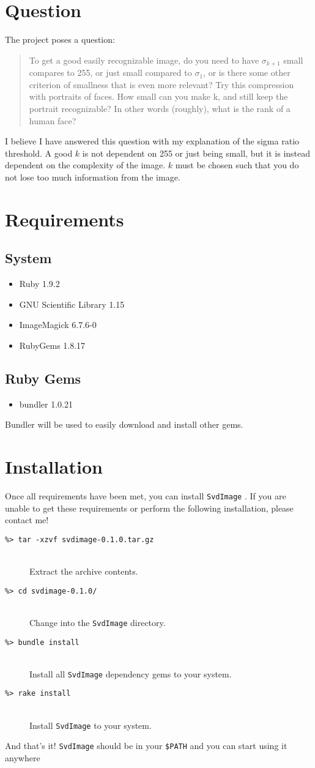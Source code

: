 \documentclass[12pt,letterpaper]{article}
\newcommand{\svdimage}{\texttt{SvdImage} }
\newcommand{\codeitem}[2]{\item[\texttt{\%> #1}] \hfill \\ #2}
\begin{document}
\section{Question}
The project poses a question:
\begin{quote}
To get a good easily recognizable image, do you need to have $\sigma_{k+1}$ small
compares to 255, or just small compared to $\sigma_1$, or is there some other criterion of smallness
that is even more relevant?
Try this compression with portraits of faces. How small can you make k, and still
keep the portrait recognizable? In other words (roughly), what is the rank of a human
face?
\end{quote}

I believe I have answered this question with my explanation of the sigma ratio
threshold. A good $k$ is not dependent on 255 or just being small, but it is
instead dependent on the complexity of the image. $k$ must be chosen such that
you do not lose too much information from the image.

\section{Requirements}
\subsection{System}
\begin{itemize}
\item Ruby 1.9.2
\item GNU Scientific Library 1.15
\item ImageMagick 6.7.6-0
\item RubyGems 1.8.17
\end{itemize}
\subsection{Ruby Gems}
\begin{itemize}
\item bundler 1.0.21
\end{itemize}
Bundler will be used to easily download and install other gems.

\section{Installation}
Once all requirements have been met, you can install \svdimage. If you are
unable to get these requirements or perform the following installation, please
contact me!
\begin{description}
\codeitem{tar -xzvf svdimage-0.1.0.tar.gz}{Extract the archive contents.}
\codeitem{cd svdimage-0.1.0/}{Change into the \svdimage directory.}
\codeitem{bundle install}{Install all \svdimage dependency gems to your
system.}
\codeitem{rake install}{Install \svdimage to your system.}
\end{description}
And that's it! \svdimage should be in your \texttt{\$PATH} and you can start
using it anywhere
\end{document}
